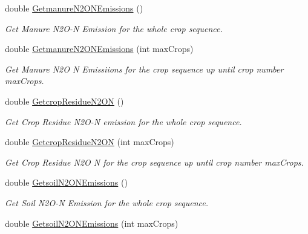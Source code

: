 \begin{DoxyCompactItemize}
\mbox{\label{class_crop_sequence_class_a16586cb2650f4022d7845851eb8a7543}} 
double \mbox{\hyperlink{class_crop_sequence_class_a16586cb2650f4022d7845851eb8a7543}{Getmanure\+N2\+O\+N\+Emissions}} ()
\begin{DoxyCompactList}\small\item\em Get Manure N2\+O-\/N Emission for the whole crop sequence. \end{DoxyCompactList}\item 
double \mbox{\hyperlink{class_crop_sequence_class_a6483d720e357417e677ef60d3dd926dc}{Getmanure\+N2\+O\+N\+Emissions}} (int max\+Crops)
\begin{DoxyCompactList}\small\item\em Get Manure N2O N Emissiions for the crop sequence up until crop number max\+Crops. \end{DoxyCompactList}\item 
\mbox{\label{class_crop_sequence_class_ad153a07bfea03b639bfa702d109ec759}} 
double \mbox{\hyperlink{class_crop_sequence_class_ad153a07bfea03b639bfa702d109ec759}{Getcrop\+Residue\+N2\+ON}} ()
\begin{DoxyCompactList}\small\item\em Get Crop Residue N2\+O-\/N emission for the whole crop sequence. \end{DoxyCompactList}\item 
double \mbox{\hyperlink{class_crop_sequence_class_a692e23e3e0d64b9b5932cea101d1534b}{Getcrop\+Residue\+N2\+ON}} (int max\+Crops)
\begin{DoxyCompactList}\small\item\em Get Crop Residue N2O N for the crop sequence up until crop number max\+Crops. \end{DoxyCompactList}\item 
\mbox{\label{class_crop_sequence_class_a25fe9085ff4966e87375b1cee8b959e0}} 
double \mbox{\hyperlink{class_crop_sequence_class_a25fe9085ff4966e87375b1cee8b959e0}{Getsoil\+N2\+O\+N\+Emissions}} ()
\begin{DoxyCompactList}\small\item\em Get Soil N2\+O-\/N Emission for the whole crop sequence. \end{DoxyCompactList}\item 
double \mbox{\hyperlink{class_crop_sequence_class_a61d3f67fda6f158732ab8379a6e25c5f}{Getsoil\+N2\+O\+N\+Emissions}} (int max\+Crops)

\end{DoxyCompactItemize}
